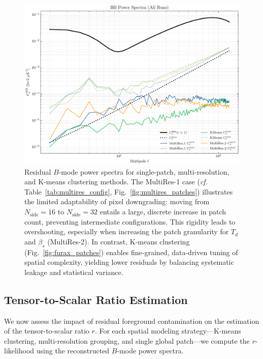 \documentclass[%
 reprint,
bibnotes,
 amsmath,amssymb,
 aps,
floatfix, 
]{revtex4-2}
\begin{document}
\begin{figure}[ht]
    \centering
    \includegraphics[width=\linewidth]{figures/bb_residual_spectra.pdf}
    \caption{
    Residual \( B \)-mode power spectra for single-patch, multi-resolution, and K-means clustering methods. 
    The MultiRes-1 case (\textit{cf.} Table~\ref{tab:multires_config}, Fig.~\ref{fig:multires_patches}) illustrates the limited adaptability of pixel downgrading: moving from \(N_{\mathrm{side}} = 16\) to \(N_{\mathrm{side}} = 32\) entails a large, discrete increase in patch count, preventing intermediate configurations. 
    This rigidity leads to overshooting, especially when increasing the patch granularity for \(T_d\) and \(\beta_s\) (MultiRes-2).
    In contrast, K-means clustering (Fig.~\ref{fig:furax_patches}) enables fine-grained, data-driven tuning of spatial complexity, yielding lower residuals by balancing systematic leakage and statistical variance. 
    }
    \label{fig:bb_spectra_comparison}
\end{figure}


\subsection{Tensor-to-Scalar Ratio Estimation}
\label{subsec:r_estimation}

We now assess the impact of residual foreground contamination on the estimation of the tensor-to-scalar ratio \( r \).
For each spatial modeling strategy—K-means clustering, multi-resolution grouping, and single global patch—we compute the \( r \)-likelihood using the reconstructed \( B \)-mode power spectra.
\end{document}
